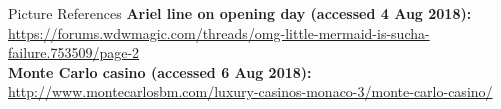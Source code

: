\documentclass{beamer}
\begin{document}
\begin{frame}{Picture References}
\tiny
\textbf{Ariel line on opening day (accessed 4 Aug 2018):} \url{https://forums.wdwmagic.com/threads/omg-little-mermaid-is-sucha-failure.753509/page-2} \\
\textbf{Monte Carlo casino (accessed 6 Aug 2018):} \url{http://www.montecarlosbm.com/luxury-casinos-monaco-3/monte-carlo-casino/}
\end{frame}
\end{document}
